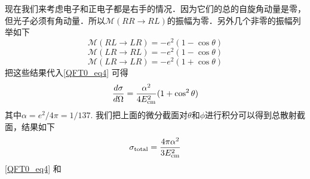 现在我们来考虑电子和正电子都是右手的情况．因为它们的总的自旋角动量是零，但光子必须有角动量．所以$\mathcal M (RR \rightarrow RL)$的振幅为零．另外几个非零的振幅列举如下
\begin{equation}
\mathcal M(RL\rightarrow LR) = - e^2(1-\cos\theta)  
\end{equation}
\begin{equation}
\mathcal M(LR\rightarrow RL) = - e^2 (1-\cos\theta)
\end{equation}
\begin{equation}
\mathcal M(LR \rightarrow LR) = - e^2(1+\cos\theta)
\end{equation}
把这些结果代入\autoref{QFT0_eq4} 可得
\begin{equation}\label{QFT0_eq4}
\frac{d\sigma}{d\Omega}  = \frac{\alpha^2}{4E_{\rm cm}^2}(1+\cos^2\theta) 
\end{equation}
其中$\alpha = e^2/4\pi=1/137$. 我们把上面的微分截面对$\theta$和$\phi$进行积分可以得到总散射截面，结果如下
\begin{equation}
\sigma_{\rm total} = \frac{4\pi \alpha^2}{3E_{\rm cm}^2}
\end{equation}
\autoref{QFT0_eq4} 和


























